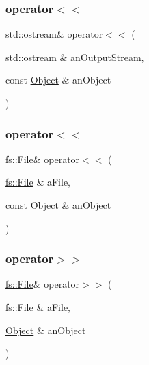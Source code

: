 \subsubsection{\texorpdfstring{operator$<$$<$}{operator<<}\hspace{0.1cm}{\footnotesize\ttfamily [1/2]}}
{\footnotesize\ttfamily std\+::ostream\& operator$<$$<$ (\begin{DoxyParamCaption}\item[{std\+::ostream \&}]{an\+Output\+Stream,  }\item[{const \hyperlink{classostk_1_1core_1_1ctnr_1_1_object}{Object} \&}]{an\+Object }\end{DoxyParamCaption})\hspace{0.3cm}{\ttfamily [friend]}}

\mbox{\label{classostk_1_1core_1_1ctnr_1_1_object_af9350d4362cb9ad3424f4a6bb6d77a4c}} 
\subsubsection{\texorpdfstring{operator$<$$<$}{operator<<}\hspace{0.1cm}{\footnotesize\ttfamily [2/2]}}
{\footnotesize\ttfamily \hyperlink{classostk_1_1core_1_1fs_1_1_file}{fs\+::\+File}\& operator$<$$<$ (\begin{DoxyParamCaption}\item[{\hyperlink{classostk_1_1core_1_1fs_1_1_file}{fs\+::\+File} \&}]{a\+File,  }\item[{const \hyperlink{classostk_1_1core_1_1ctnr_1_1_object}{Object} \&}]{an\+Object }\end{DoxyParamCaption})\hspace{0.3cm}{\ttfamily [friend]}}

\mbox{\label{classostk_1_1core_1_1ctnr_1_1_object_ad91e1957f0afd5d49dde0b81d11a66e1}} 
\subsubsection{\texorpdfstring{operator$>$$>$}{operator>>}}
{\footnotesize\ttfamily \hyperlink{classostk_1_1core_1_1fs_1_1_file}{fs\+::\+File}\& operator$>$$>$ (\begin{DoxyParamCaption}\item[{\hyperlink{classostk_1_1core_1_1fs_1_1_file}{fs\+::\+File} \&}]{a\+File,  }\item[{\hyperlink{classostk_1_1core_1_1ctnr_1_1_object}{Object} \&}]{an\+Object }\end{DoxyParamCaption})\hspace{0.3cm}{\ttfamily [friend]}}



